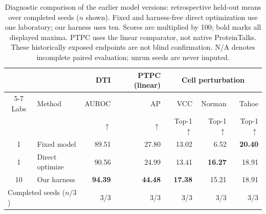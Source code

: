 \begin{table}[t]
\centering\small
\setlength{\tabcolsep}{3pt}
\begin{tabular}{clrrrrr}
\toprule
 & & DTI & PTPC (linear) & \multicolumn{3}{c}{Cell perturbation} \\
\cmidrule(lr){5-7}
Labs & Method & AUROC & AP & VCC & Norman & Tahoe \\
 & & $\uparrow$ & $\uparrow$ & Top-1 $\uparrow$ & Top-1 $\uparrow$ & Top-1 $\uparrow$ \\
\midrule
1 & Fixed model & 89.51 & 27.80 & 13.02 & 6.52 & \textbf{20.40} \\
1 & Direct optimize & 90.56 & 24.99 & 13.41 & \textbf{16.27} & 18.91 \\
10 & Our harness & \textbf{94.39} & \textbf{44.48} & \textbf{17.38} & 15.21 & 18.91 \\
\midrule
\multicolumn{2}{l}{Completed seeds ($n/3$)} & 3/3 & 3/3 & 3/3 & 3/3 & 3/3 \\
\bottomrule
\end{tabular}
\caption{Diagnostic comparison of the earlier model versions: retrospective held-out means over completed seeds ($n$ shown). Fixed and harness-free direct optimization use one laboratory; our harness uses ten. Scores are multiplied by 100; bold marks all displayed maxima. PTPC uses the linear comparator, not native ProteinTalks. These historically exposed endpoints are not blind confirmation. N/A denotes incomplete paired evaluation; unrun seeds are never imputed.}
\label{tab:unified-final}
\end{table}
